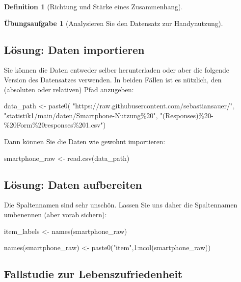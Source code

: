 \documentclass[
  a4paper,
  DIV=11]{scrreprt}
\newenvironment{Shaded}{\begin{snugshade}}{\end{snugshade}}
\newcommand{\DecValTok}[1]{\textcolor[rgb]{0.68,0.00,0.00}{#1}}
\newcommand{\FunctionTok}[1]{\textcolor[rgb]{0.28,0.35,0.67}{#1}}
\newcommand{\NormalTok}[1]{\textcolor[rgb]{0.00,0.23,0.31}{#1}}
\newcommand{\OtherTok}[1]{\textcolor[rgb]{0.00,0.23,0.31}{#1}}
\newcommand{\SpecialCharTok}[1]{\textcolor[rgb]{0.37,0.37,0.37}{#1}}
\newcommand{\StringTok}[1]{\textcolor[rgb]{0.13,0.47,0.30}{#1}}
\theoremstyle{definition}
\newtheorem{exercise}{Übungsaufgabe}[chapter]
\theoremstyle{definition}
\theoremstyle{definition}
\newtheorem{definition}{Definition}[chapter]
\theoremstyle{remark}
\begin{document}
\begin{definition}[Richtung und Stärke eines
Zusammenhang]
\begin{exercise}[Analysieren Sie den Datensatz zur
Handynutzung]
\subsection{Lösung: Daten importieren}

Sie können die Daten entweder selber herunterladen oder aber die
folgende Version des Datensatzes verwenden. In beiden Fällen ist es
nützlich, den (absoluten oder relativen) Pfad anzugeben:

\begin{Shaded}
\begin{Highlighting}[]
\NormalTok{data\_path }\OtherTok{\textless{}{-}} \FunctionTok{paste0}\NormalTok{(}
  \StringTok{"https://raw.githubusercontent.com/sebastiansauer/"}\NormalTok{,}
  \StringTok{"statistik1/main/daten/Smartphone{-}Nutzung\%20"}\NormalTok{,}
  \StringTok{"(Responses)\%20{-}\%20Form\%20responses\%201.csv"}\NormalTok{)}
\end{Highlighting}
\end{Shaded}

Dann können Sie die Daten wie gewohnt importieren:

\begin{Shaded}
\begin{Highlighting}[]
\NormalTok{smartphone\_raw }\OtherTok{\textless{}{-}} \FunctionTok{read.csv}\NormalTok{(data\_path)}
\end{Highlighting}
\end{Shaded}

\subsection{Lösung: Daten aufbereiten}

Die Spaltennamen sind sehr unschön. Lassen Sie uns daher die
Spaltennamen umbenennen (aber vorab sichern):

\begin{Shaded}
\begin{Highlighting}[]
\NormalTok{item\_labels }\OtherTok{\textless{}{-}} \FunctionTok{names}\NormalTok{(smartphone\_raw)}

\FunctionTok{names}\NormalTok{(smartphone\_raw) }\OtherTok{\textless{}{-}} \FunctionTok{paste0}\NormalTok{(}\StringTok{"item"}\NormalTok{,}\DecValTok{1}\SpecialCharTok{:}\FunctionTok{ncol}\NormalTok{(smartphone\_raw))}
\end{Highlighting}
\end{Shaded}

\subsection{Fallstudie zur
Lebenszufriedenheit}\label{fallstudie-zur-lebenszufriedenheit}


\end{exercise}
\end{definition}
\end{document}
